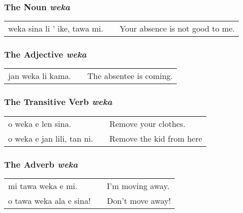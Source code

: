 \subsubsection*{The Noun \textit{weka}}
%

\begin{supertabular}{p{5,5cm}|ll}
weka sina li ' ike, tawa mi. && Your absence is not good to me. \\
\end{supertabular} 
%
\subsubsection*{The Adjective \textit{weka}}
%

\begin{supertabular}{p{5,5cm}|ll}
jan weka li kama. && The absentee is coming. \\
\end{supertabular} 

%
\subsubsection*{The Transitive Verb \textit{weka}}
%

\begin{supertabular}{p{5,5cm}|ll}
o weka e len sina. && Remove your clothes. \\
o weka e jan lili, tan ni. && Remove the kid from here \\ 
\end{supertabular} 

%
\subsubsection*{The Adverb \textit{weka}}
%

\begin{supertabular}{p{5,5cm}|ll}
mi tawa weka e mi. && I'm moving away. \\
o tawa weka ala e sina! && Don't move away! \\
\end{supertabular} 

